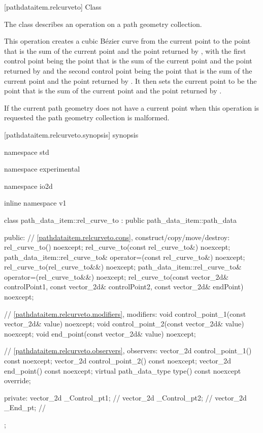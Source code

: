  [pathdataitem.relcurveto] {Class }

\pnum
{}
The class  describes an operation on a path geometry collection.

\pnum
This operation creates a cubic B\'ezier curve from the current point to the point that is the sum of the current point and the point returned by , with the first control point being the point that is the sum of the current point and the point returned by  and the second control point being the point that is the sum of the current point and the point returned by . It then sets the current point to be the point that is the sum of the current point and the point returned by .

\pnum
If the current path geometry does not have a current point when this operation is requested the path geometry collection is malformed.

 [pathdataitem.relcurveto.synopsis] { synopsis}

\begin{codeblock}
namespace std { namespace experimental { namespace io2d { inline namespace v1 {
  class path_data_item::rel_curve_to : public path_data_item::path_data {
  public:
    // \ref{pathdataitem.relcurveto.cons}, construct/copy/move/destroy:
    rel_curve_to() noexcept;
    rel_curve_to(const rel_curve_to&) noexcept;
    path_data_item::rel_curve_to& operator=(const rel_curve_to&) noexcept;
    rel_curve_to(rel_curve_to&&) noexcept;
    path_data_item::rel_curve_to& operator=(rel_curve_to&&) noexcept;
    rel_curve_to(const vector_2d& controlPoint1, const vector_2d& controlPoint2,
      const vector_2d& endPoint) noexcept;

    // \ref{pathdataitem.relcurveto.modifiers}, modifiers:
    void control_point_1(const vector_2d& value) noexcept;
    void control_point_2(const vector_2d& value) noexcept;
    void end_point(const vector_2d& value) noexcept;

    // \ref{pathdataitem.relcurveto.observers}, observers:
    vector_2d control_point_1() const noexcept;
    vector_2d control_point_2() const noexcept;
    vector_2d end_point() const noexcept;
    virtual path_data_type type() const noexcept override;
    
  private:
    vector_2d _Control_pt1; // \expos
    vector_2d _Control_pt2; // \expos
    vector_2d _End_pt;      // \expos
  };
} } } }
\end{codeblock}

